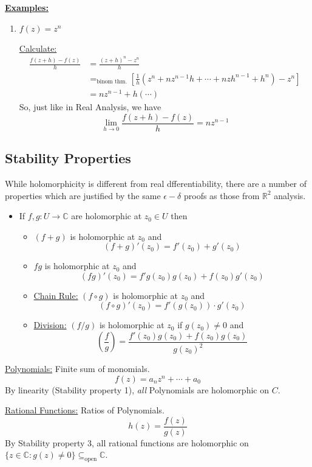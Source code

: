 \documentclass{article}
\newcommand{\R}{\mathbb{R}}
\newcommand{\C}{\mathbb{C}}
\begin{document}
\vskip 0.5cm
\underline{\textbf{Examples:}}
\begin{enumerate}
  \item $f(z) = z^n$ 
  
  \vskip 0.5cm
  \underline{Calculate:} 
  \begin{align*}
    \frac{f(z+h)-f(z)}{h} &= \frac{(z+h)^n - z^n}{h} \\
    &=_{\text{binom thm.}} \left[  \frac{1}{h} \left( z^n + nz^{n-1}h + \cdots + nzh^{n-1} + h^n \right) - z^n  \right] \\
    &= nz^{n-1} + h(\cdots)
  \end{align*}
  So, just like in Real Analysis, we have 
  \[ \boxed{\lim_{h \rightarrow 0} \frac{f(z + h) - f(z)}{h} = nz^{n-1}} \]
\end{enumerate}

\vskip 1cm
\subsection{Stability Properties}
While holomorphicity is different from real dfferentiability, there are a number of properties which are justified by the same $\epsilon-\delta$ proofs as those from $\R^2$ analysis.

\begin{itemize}
  \item If $f,g : U \rightarrow \C$ are holomorphic at $z_0 \in U$ then 
  \begin{itemize}
    \item $(f+g)$ is holomorphic at $z_0$ and 
    \[ (f+g)'(z_0) = f'(z_0) + g'(z_0) \]
  
    \item $fg$ is holomorphic at $z_0$ and
    \[ (fg)'(z_0) = f'g(z_0)g(z_0) + f(z_0)g'(z_0) \]
    
    \vskip 0.5cm
    \item \underline{Chain Rule:} $(f \circ g)$ is holomorphic at $z_0$ and 
    \[ (f \circ g)'(z_0) = f'(g(z_0)) \cdot g'(z_0) \]
    
    \vskip 0.5cm
    \item \underline{Division:} $(f/g)$ is holomorphic at $z_0$ if $g(z_0) \neq 0$ and
    \[ \left( \frac{f}{g} \right) = \frac{f'(z_0)g(z_0) + f(z_0)g(z_0)}{g(z_0)^2} \]
  \end{itemize}
\end{itemize}

\vskip 0.5cm
\begin{dottedbox}
  \underline{Polynomials:} Finite sum of monomials.
  \[ f(z) = a_nz^n + \cdots + a_0 \]
  By linearity (Stability property 1), \emph{all} Polynomials are holomorphic on $C$.
  
  \vskip 1cm
  \underline{Rational Functions:} Ratios of Polynomials.
  \[ h(z) = \frac{f(z)}{g(z)} \]
  By Stability property 3, all rational functions are holomorphic on $\{ z \in \C : g(z) \neq 0 \} \subseteq_{\text{open}} \C$.
\end{dottedbox}
\end{document}
